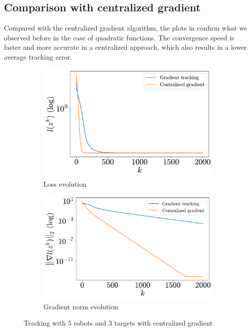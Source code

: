 \documentclass[a4paper,11pt,oneside]{book}
\begin{document}
\subsection{Comparison with centralized gradient}

Compared with the centralized gradient algorithm, the plots in  confirm what we observed before in the case of quadratic functions. The convergence speed is faster and more accurate in a centralized approach, which also results in a lower average tracking error.

\begin{figure}[htb!]
      \centering
      \begin{subfigure}[t]{0.46\linewidth}
            \centering
            \includegraphics[width=\linewidth]{./figs/tracking/centralized/loss.pdf} 
            \caption{Loss evolution}
      \end{subfigure}
      \hfill
      \begin{subfigure}[t]{0.46\linewidth}
            \centering
            \includegraphics[width=\linewidth]{./figs/tracking/centralized/gradient.pdf} 
            \caption{Gradient norm evolution}
      \end{subfigure}
      \caption{Tracking with $5$ robots and $3$ targets with centralized gradient}
      \label{fig:tracking_centralized_5_3}
\end{figure}
\end{document}
